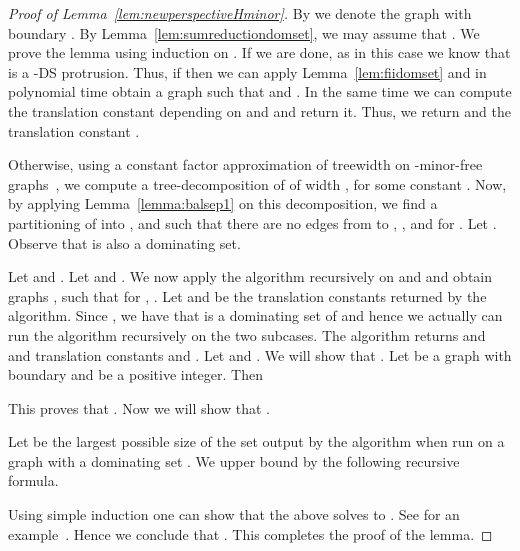 \documentclass[11pt]{article}
\newcommand{\Hmf}{-minor-free}
\begin{document}
\begin{proof}[Proof of Lemma~\ref{lem:newperspectiveHminor}]
By  we denote the graph with boundary . 
By Lemma~\ref{lem:sumreductiondomset},  we may assume that . We prove the lemma using induction on . 
If  we are done, as in this case we know that  is a -{\sc DS} protrusion. Thus, if  then 
 we can apply Lemma~\ref{lem:fiidomset} and in polynomial time obtain a graph  such that  and 
 . In the same time we can compute the translation constant depending on  and  
 and return it. Thus, we return   and the translation constant . 
 



Otherwise, using a constant factor approximation of treewidth on \Hmf \, graphs~\cite{FeigeHajLee08}, we compute a tree-decomposition of  of width , for some constant . Now, by applying Lemma~\ref{lemma:balsep1} on this decomposition, we find a partitioning of  into ,  and  such that there are no edges from  to , , and  for . Let 
. Observe that  is also a dominating set. 


Let  and .  Let  and . 
We now apply the algorithm recursively on 
 and  and obtain graphs 
,   such that for ,  . Let  and  be the translation 
constants returned by the algorithm.  Since , we have that  is   a dominating set of  and hence we actually can run the algorithm recursively on the two subcases. The algorithm returns  and  and translation constants  and . Let 
 and .  We will show that . Let  be a graph with boundary  and  be a positive integer.  Then

This proves that .  Now we will show that  . 

Let  be the largest possible
size of the set  output by the algorithm when run on a graph  with a
dominating set . We
upper bound  by the following recursive formula.
 
Using simple induction one can show that the above solves to . See for an example~\cite[Lemma~]{FominLRS10}. Hence we conclude that . This completes the proof of the lemma. 
\end{proof}
\end{document}
